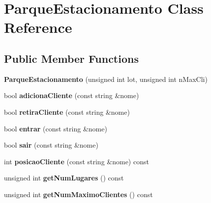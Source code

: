 \hypertarget{classParqueEstacionamento}{}\section{Parque\+Estacionamento Class Reference}
\label{classParqueEstacionamento}
\subsection*{Public Member Functions}
\begin{DoxyCompactItemize}
\item 
\mbox{\label{classParqueEstacionamento_a351972e05487e365b6940b8327bc7f09}} 
{\bfseries Parque\+Estacionamento} (unsigned int lot, unsigned int n\+Max\+Cli)
\item 
\mbox{\label{classParqueEstacionamento_a5d447a45409f982304607188b926b7f7}} 
bool {\bfseries adiciona\+Cliente} (const string \&nome)
\item 
\mbox{\label{classParqueEstacionamento_a50d8386cde9ab11988540a1fb4e20bea}} 
bool {\bfseries retira\+Cliente} (const string \&nome)
\item 
\mbox{\label{classParqueEstacionamento_a028d97cb1db8e5ba015d1566cda9d6ae}} 
bool {\bfseries entrar} (const string \&nome)
\item 
\mbox{\label{classParqueEstacionamento_ac8a62193fec8e0c91f62b6dcd77486cd}} 
bool {\bfseries sair} (const string \&nome)
\item 
\mbox{\label{classParqueEstacionamento_a322cd9cb62b69c8d36b8cfc523d7350b}} 
int {\bfseries posicao\+Cliente} (const string \&nome) const
\item 
\mbox{\label{classParqueEstacionamento_a043a87c1d2e9b2a0b4d36939a7b3bb05}} 
unsigned int {\bfseries get\+Num\+Lugares} () const
\item 
\mbox{\label{classParqueEstacionamento_a0ba07ce8524448fd0f7f0107eb1ba9a4}} 
unsigned int {\bfseries get\+Num\+Maximo\+Clientes} () const

\end{DoxyCompactItemize}
